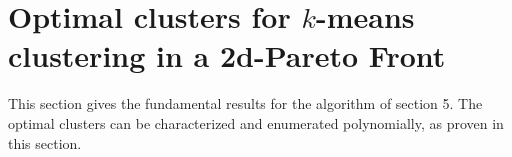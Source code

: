 \documentclass{meta}
\def\HH{{\mathcal{H}}}
\newtheorem{prop}{Proposition}
\begin{document}
% 
% 
% 
% 
% 
% 
% 
% 


% 

\section{Optimal clusters for $k$-means clustering in a 2d-Pareto Front}

This section gives the fundamental results for the algorithm of section 5.
The optimal clusters can be characterized and enumerated polynomially, as proven in this section.
\end{document}
